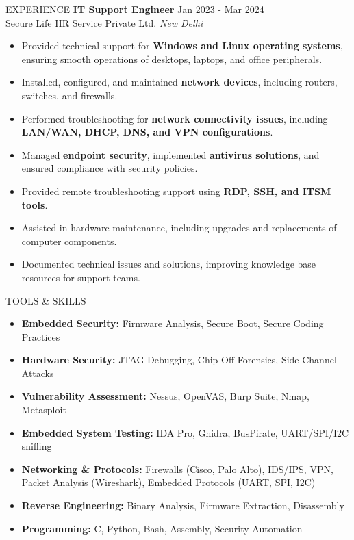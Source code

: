 \documentclass{resume} %
\begin{document}
\begin{rSection}{EXPERIENCE}
\vspace{4mm}
\textbf{IT Support Engineer} \hfill Jan 2023 - Mar 2024\\
Secure Life HR Service Private Ltd. \hfill \textit{New Delhi}
 \begin{itemize}
    \itemsep -3pt {}
    \item Provided technical support for \textbf{Windows and Linux operating systems}, ensuring smooth operations of desktops, laptops, and office peripherals.
    \item Installed, configured, and maintained \textbf{network devices}, including routers, switches, and firewalls.
    \item Performed troubleshooting for \textbf{network connectivity issues}, including \textbf{LAN/WAN, DHCP, DNS, and VPN configurations}.
    \item Managed \textbf{endpoint security}, implemented \textbf{antivirus solutions}, and ensured compliance with security policies.
    \item Provided remote troubleshooting support using \textbf{RDP, SSH, and ITSM tools}.
    \item Assisted in hardware maintenance, including upgrades and replacements of computer components.
    \item Documented technical issues and solutions, improving knowledge base resources for support teams.
\end{itemize}



\end{rSection}

\begin{rSection}{TOOLS \& SKILLS}
\begin{itemize}
    \item \textbf{Embedded Security:} Firmware Analysis, Secure Boot, Secure Coding Practices
    \item \textbf{Hardware Security:} JTAG Debugging, Chip-Off Forensics, Side-Channel Attacks
    \item \textbf{Vulnerability Assessment:} Nessus, OpenVAS, Burp Suite, Nmap, Metasploit
    \item \textbf{Embedded System Testing:} IDA Pro, Ghidra, BusPirate, UART/SPI/I2C sniffing
    \item \textbf{Networking \& Protocols:} Firewalls (Cisco, Palo Alto), IDS/IPS, VPN, Packet Analysis (Wireshark), Embedded Protocols (UART, SPI, I2C)
    \item \textbf{Reverse Engineering:} Binary Analysis, Firmware Extraction, Disassembly
    \item \textbf{Programming:} C, Python, Bash, Assembly, Security Automation
\end{itemize}
\end{rSection}
\end{document}
